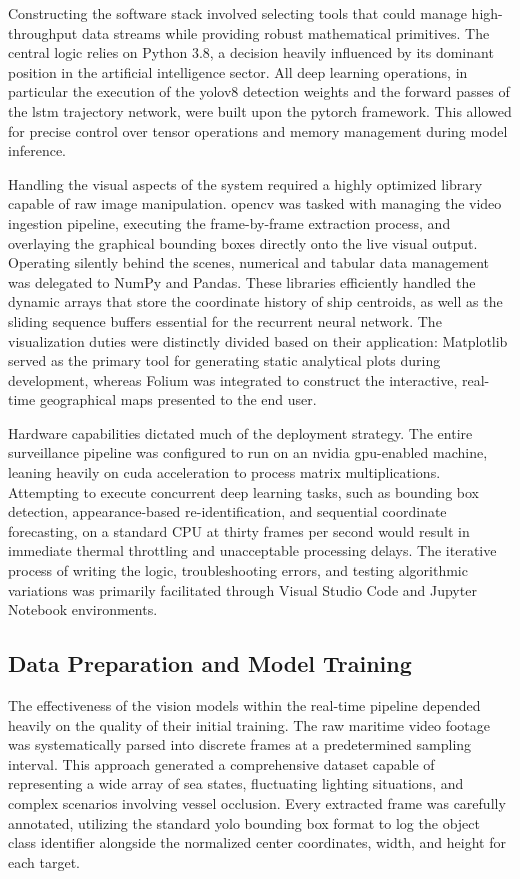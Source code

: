 Constructing the software stack involved selecting tools that could manage high-throughput data streams while providing robust mathematical primitives. The central logic relies on Python 3.8, a decision heavily influenced by its dominant position in the artificial intelligence sector. All deep learning operations, in particular the execution of the \gls{yolov8} detection weights and the forward passes of the \gls{lstm} trajectory network, were built upon the \gls{pytorch} framework. This allowed for precise control over tensor operations and memory management during model inference.

Handling the visual aspects of the system required a highly optimized library capable of raw image manipulation. \gls{opencv} was tasked with managing the video ingestion pipeline, executing the frame-by-frame extraction process, and overlaying the graphical bounding boxes directly onto the live visual output. Operating silently behind the scenes, numerical and tabular data management was delegated to NumPy and Pandas. These libraries efficiently handled the dynamic arrays that store the coordinate history of ship centroids, as well as the sliding sequence buffers essential for the recurrent neural network. The visualization duties were distinctly divided based on their application: Matplotlib served as the primary tool for generating static analytical plots during development, whereas Folium was integrated to construct the interactive, real-time geographical maps presented to the end user.

Hardware capabilities dictated much of the deployment strategy. The entire surveillance pipeline was configured to run on an \gls{nvidia} \gls{gpu}-enabled machine, leaning heavily on \gls{cuda} acceleration to process matrix multiplications. Attempting to execute concurrent deep learning tasks, such as bounding box detection, appearance-based re-identification, and sequential coordinate forecasting, on a standard CPU at thirty frames per second would result in immediate thermal throttling and unacceptable processing delays. The iterative process of writing the logic, troubleshooting errors, and testing algorithmic variations was primarily facilitated through Visual Studio Code and Jupyter Notebook environments.

\subsection{Data Preparation and Model Training}

The effectiveness of the vision models within the real-time pipeline depended heavily on the quality of their initial training. The raw maritime video footage was systematically parsed into discrete frames at a predetermined sampling interval. This approach generated a comprehensive dataset capable of representing a wide array of sea states, fluctuating lighting situations, and complex scenarios involving vessel occlusion. Every extracted frame was carefully annotated, utilizing the standard \gls{yolo} bounding box format to log the object class identifier alongside the normalized center coordinates, width, and height for each target.

